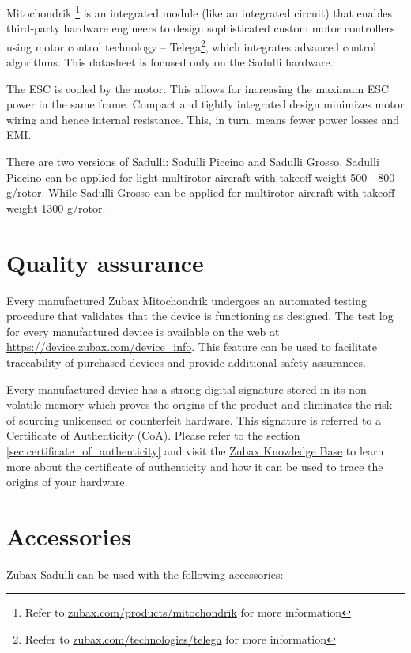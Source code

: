 \documentclass{zubaxdoc}
\begin{document}
Mitochondrik \footnote{Refer to \url{zubax.com/products/mitochondrik} for more information} is an integrated module 
(like an integrated circuit) that enables third-party hardware engineers to design sophisticated custom motor 
controllers using motor control technology -- Tele\-ga\footnote{Reefer to \url{zubax.com/technologies/telega} 
for more information}, which integrates advanced control algorithms. This datasheet is focused only on the Sadulli 
hardware.
  
The ESC is cooled by the motor. This allows for increasing the maximum ESC power in the same frame. 
Compact and tightly integrated design minimizes motor wiring and hence internal resistance. This, in turn, 
means fewer power losses and EMI. 

There are two versions of Sadulli: Sadulli Piccino and Sadulli Grosso. 
Sadulli Piccino can be applied for light multirotor aircraft with takeoff weight 500 - 800  g/rotor. 
While Sadulli Grosso can be applied for multirotor aircraft with takeoff weight 1300 g/rotor. 

\section{Quality assurance}

Every manufactured Zubax Mitochondrik undergoes an automated testing procedure that validates that
the device is functioning as designed.
The test log for every manufactured device is available on the web at
\url{https://device.zubax.com/device_info}.
This feature can be used to facilitate traceability of purchased devices and provide additional safety assurances.

Every manufactured device has a strong digital signature stored in its non-volatile memory
which proves the origins of the product and eliminates the risk of sourcing unlicensed or
counterfeit hardware.
This signature is referred to a Certificate of Authenticity (CoA).
Please refer to the section \ref{sec:certificate_of_authenticity} and visit the
\href{https://kb.zubax.com}{Zubax Knowledge Base} to learn more about
the certificate of authenticity and how it can be used to trace the origins of your hardware.


\section{Accessories}

Zubax Sadulli can be used with the following accessories:
\end{document}
